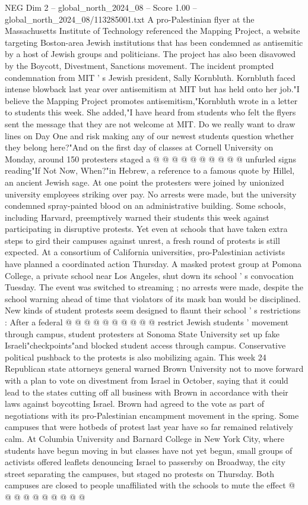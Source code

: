 \begin{textsample}{NEG Dim 2 – global\_north\_2024\_08 – Score 1.00 – global\_north\_2024\_08/113285001.txt}
A pro-Palestinian flyer at the Massachusetts Institute of Technology referenced the Mapping Project, a website targeting Boston-area Jewish institutions that has been condemned as antisemitic by a host of Jewish groups and politicians.
The project has also been disavowed by the Boycott, Divestment, Sanctions movement.
The incident prompted condemnation from MIT ' s Jewish president, Sally Kornbluth.
Kornbluth faced intense blowback last year over antisemitism at MIT but has held onto her job."I believe the Mapping Project promotes antisemitism,"Kornbluth wrote in a letter to students this week.
She added,"I have heard from students who felt the flyers sent the message that they are not welcome at MIT.
Do we really want to draw lines on Day One and risk making any of our newest students question whether they belong here?"And on the first day of classes at Cornell University on Monday, around 150 protesters staged a @ @ @ @ @ @ @ @ @ @ unfurled signs reading"If Not Now, When?"in Hebrew, a reference to a famous quote by Hillel, an ancient Jewish sage.
At one point the protesters were joined by unionized university employees striking over pay.
No arrests were made, but the university condemned spray-painted blood on an administrative building.
Some schools, including Harvard, preemptively warned their students this week against participating in disruptive protests.
Yet even at schools that have taken extra steps to gird their campuses against unrest, a fresh round of protests is still expected.
At a consortium of California universities, pro-Palestinian activists have planned a coordinated action Thursday.
A masked protest group at Pomona College, a private school near Los Angeles, shut down its school ' s convocation Tuesday.
The event was switched to streaming ; no arrests were made, despite the school warning ahead of time that violators of its mask ban would be disciplined.
New kinds of student protests seem designed to flaunt their school ' s restrictions : After a federal @ @ @ @ @ @ @ @ @ @ restrict Jewish students ' movement through campus, student protesters at Sonoma State University set up fake Israeli"checkpoints"and blocked student access through campus.
Conservative political pushback to the protests is also mobilizing again.
This week 24 Republican state attorneys general warned Brown University not to move forward with a plan to vote on divestment from Israel in October, saying that it could lead to the states cutting off all business with Brown in accordance with their laws against boycotting Israel.
Brown had agreed to the vote as part of negotiations with its pro-Palestinian encampment movement in the spring.
Some campuses that were hotbeds of protest last year have so far remained relatively calm.
At Columbia University and Barnard College in New York City, where students have begun moving in but classes have not yet begun, small groups of activists offered leaflets denouncing Israel to passersby on Broadway, the city street separating the campuses, but staged no protests on Thursday.
Both campuses are closed to people unaffiliated with the schools to mute the effect @ @ @ @ @ @ @ @ @ @

\end{textsample}
